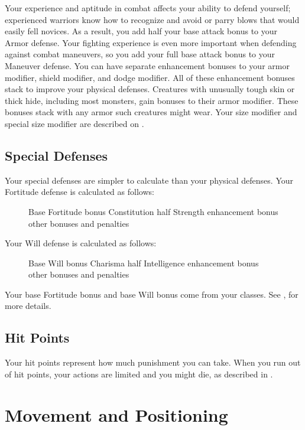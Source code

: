  Your experience and aptitude in combat affects your ability to defend yourself; experienced warriors know how to recognize and avoid or parry blows that would easily fell novices. As a result, you add half your base attack bonus to your Armor defense. Your fighting experience is even more important when defending against combat maneuvers, so you add your full base attack bonus to your Maneuver defense.
 You can have separate enhancement bonuses to your armor modifier, shield modifier, and dodge modifier. All of these enhancement bonuses stack to improve your physical defenses.
 Creatures with unusually tough skin or thick hide, including most monsters, gain bonuses to their armor modifier. These bonuses stack with any armor such creatures might wear.
 Your size modifier and special size modifier are described on .

\subsection{Special Defenses}

Your special defenses are simpler to calculate than your physical defenses. Your Fortitude defense is calculated as follows:

\begin{figure}[h]
\centering Base Fortitude bonus \add Constitution \add half Strength \add enhancement bonus \add other bonuses and penalties
\end{figure}

Your Will defense is calculated as follows:

\begin{figure}[h]
\centering Base Will bonus \add Charisma \add half Intelligence \add enhancement bonus \add other bonuses and penalties
\end{figure}
 Your base Fortitude bonus and base Will bonus come from your classes. See , for more details.

\subsection{Hit Points}
Your hit points represent how much punishment you can take. When you run out of hit points, your actions are limited and you might die, as described in .

\section{Movement and Positioning}\label{Movement and Positioning}


